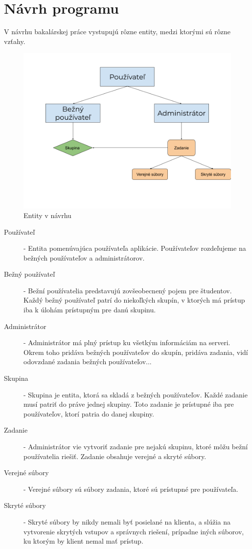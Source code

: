 \chapter{Návrh programu}

\label{kap:design} %

V návrhu bakalárskej práce vystupujú rôzne entity, medzi ktorými sú rôzne vzťahy. 
\begin{figure}[H]
\centerline{\includegraphics[width=1\textwidth]{images/entity}}
\caption[Entity v návrhu]{Entity v návrhu}
\label{obr:entity}
\end{figure}

\begin{description}
\item [Používateľ] - Entita pomenúvajúca používateľa aplikácie. Používateľov rozdeľujeme na 
bežných používateľov a administrátorov.
\item [Bežný používateľ] - Bežní používatelia predstavujú zovšeobecnený pojem pre študentov. Každý
bežný používateľ patrí do niekoľkých skupín, v ktorých má prístup iba k úlohám prístupným pre danú
skupinu.
\item [Administrátor] - Administrátor má plný prístup ku všetkým informáciám na serveri. Okrem
toho pridáva bežných používateľov do skupín, pridáva zadania, vidí o\-dov\-zdané zadania bežných
používateľov...
\item [Skupina] - Skupina je entita, ktorá sa skladá z bežných používateľov. Každé zadanie musí
patriť do práve jednej skupiny. Toto zadanie je prístupné iba pre používateľov, ktorí patria do
danej skupiny. 
\item [Zadanie] - Administrátor vie vytvoriť zadanie pre nejakú skupinu, ktoré môžu bežní
používatelia riešiť. Zadanie obsahuje verejné a skryté súbory.
\item [Verejné súbory] - Verejné súbory sú súbory zadania, ktoré sú prístupné pre používateľa.
\item [Skryté súbory] - Skryté súbory by nikdy nemali byť posielané na klienta, a slúžia na 
vytvorenie skrytých vstupov a správnych riešení, prípadne iných súborov, ku ktorým by klient
nemal mať prístup.
\end{description}

